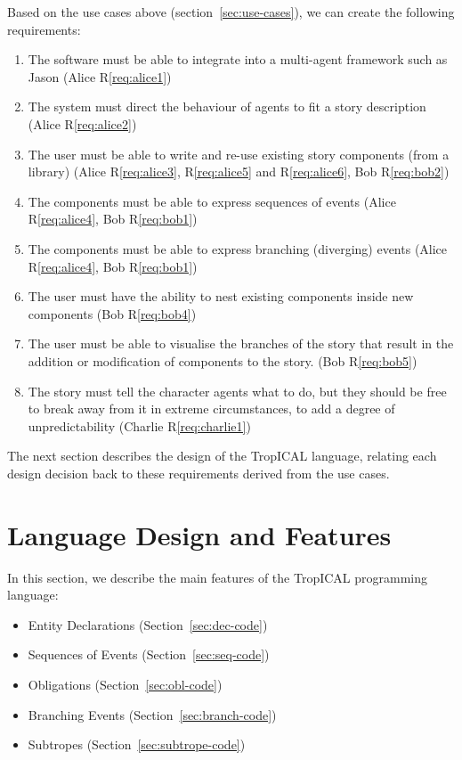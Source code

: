 \documentclass[11pt]{report}
\begin{document}
Based on the use cases above (section~\ref{sec:use-cases}), we can create the
following requirements:

\begin{enumerate}[R1.]
  \item\label{req:agents} The software must be able to integrate into a
    multi-agent framework such as Jason (Alice R\ref{req:alice1})
  \item\label{req:direct} The system must direct the behaviour of agents to fit
    a story description (Alice R\ref{req:alice2})
  \item\label{req:components} The user must be able to write and re-use
    existing story components (from a library) (Alice R\ref{req:alice3}, R\ref{req:alice5} and R\ref{req:alice6}, Bob R\ref{req:bob2})
  \item\label{req:sequences} The components must be able to express sequences of
    events (Alice R\ref{req:alice4}, Bob R\ref{req:bob1})
  \item\label{req:branches} The components must be able to express branching
    (diverging) events (Alice R\ref{req:alice4}, Bob R\ref{req:bob1})
  \item\label{req:subtropes} The user must have the ability to nest existing
    components inside new components (Bob R\ref{req:bob4})
  \item\label{req:vis} The user must be able to visualise the branches of the
    story that result in the addition or modification of components to the
    story. (Bob R\ref{req:bob5})
  \item\label{req:norm} The story must tell the character agents what to do, but
    they should be free to break away from it in extreme circumstances, to add a
    degree of unpredictability (Charlie R\ref{req:charlie1})
\end{enumerate}

The next section describes the design of the TropICAL language, relating each
design decision back to these requirements derived from the use cases.

\section{Language Design and Features}
\label{sec:language-design}
In this section, we describe the main features of the TropICAL programming
language:

\begin{itemize}
  \item Entity Declarations (Section~\ref{sec:dec-code})
  \item Sequences of Events (Section~\ref{sec:seq-code})
  \item Obligations (Section~\ref{sec:obl-code})
  \item Branching Events (Section~\ref{sec:branch-code})
  \item Subtropes (Section~\ref{sec:subtrope-code})
\end{itemize}
\end{document}
